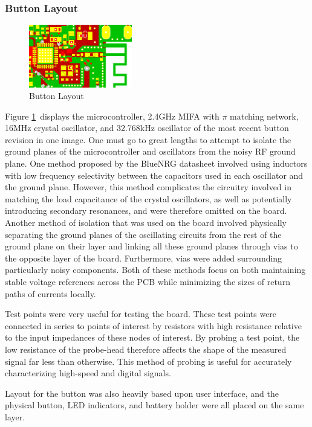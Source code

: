 \documentclass[journal,compsoc]{IEEEtran}
\begin{document}
\subsubsection{Button Layout}

\begin{figure}[H]
\centering
\includegraphics[width=0.4\textwidth]{button_ship_nice.PNG}
\caption{Button Layout}
\label{buttlay}
\end{figure}

Figure \ref{buttlay}~displays the microcontroller, 2.4GHz MIFA with $\pi$ matching network, 16MHz crystal oscillator, and 32.768kHz oscillator of the most recent button revision in one image. One must go to great lengths to attempt to isolate the ground planes of the microcontroller and oscillators from the noisy RF ground plane.  One method proposed by the BlueNRG datasheet involved using inductors with low frequency selectivity between the capacitors used in each oscillator and the ground plane.  However, this method complicates the circuitry involved in matching the load capacitance of the crystal oscillators, as well as potentially introducing secondary resonances, and were therefore omitted on the board.  Another method of isolation that was used on the board involved physically separating the ground planes of the oscillating circuits from the rest of the ground plane on their layer and linking all these ground planes through vias to the opposite layer of the board.  Furthermore, vias were added surrounding particularly noisy components.  Both of these methods focus on both maintaining stable voltage references across the PCB while minimizing the sizes of return paths of currents locally.

Test points were very useful for testing the board. These test points were connected in series to points of interest by resistors with high resistance relative to the input impedances of these nodes of interest.  By probing a test point, the low resistance of the probe-head therefore affects the shape of the measured signal far less than otherwise.  This method of probing is useful for accurately characterizing high-speed and digital signals.

Layout for the button was also heavily based upon user interface, and the physical button, LED indicators, and battery holder were all placed on the same layer.
\end{document}
